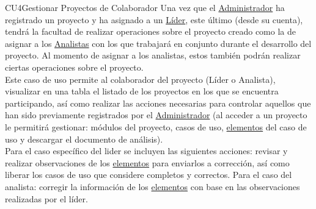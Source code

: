 	\begin{UseCase}{CU4}{Gestionar Proyectos de Colaborador}{
		Una vez que el \hyperlink{admin}{Administrador} ha registrado un proyecto y ha asignado a un \hyperlink{jefe}{Líder}, este último (desde su cuenta), tendrá la facultad de realizar operaciones sobre el proyecto creado como la de asignar a los \hyperlink{analista}{Analistas} con los que trabajará en conjunto durante el desarrollo del proyecto. Al momento de asignar a los analistas, estos también podrán realizar ciertas operaciones sobre el proyecto.\\
		
		Este caso de uso permite al colaborador del proyecto (Líder o Analista), visualizar en una tabla el listado de los proyectos en los que se encuentra participando, así como realizar las acciones necesarias para controlar aquellos que han sido previamente registrados por el \hyperlink{admin}{Administrador} (al acceder a un proyecto le permitirá gestionar: módulos del proyecto, casos de uso, \hyperlink{tElemento}{elementos} del caso de uso y descargar el documento de análisis).\\
		
		Para el caso específico del lider se incluyen las siguientes acciones: revisar y realizar observaciones de los \hyperlink{tElemento}{elementos} para enviarlos a corrección, así como liberar los casos de uso que considere completos y correctos. Para el caso del analista: corregir la información de los \hyperlink{tElemento}{elementos} con base en las observaciones realizadas por el líder. \\
	}
\end{UseCase}
